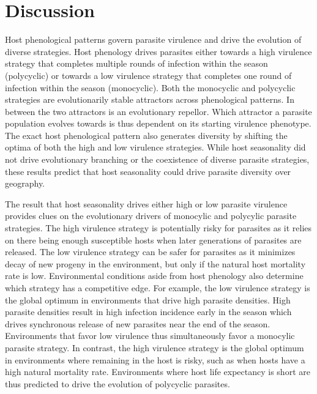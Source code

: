 \documentclass{article}
\begin{document}
\section*{Discussion}
Host phenological patterns govern parasite virulence and drive the evolution of diverse strategies. Host phenology drives parasites either towards a high virulence strategy that completes multiple rounds of infection within the season (polycyclic) or towards a low virulence strategy that completes one round of infection within the season (monocyclic). Both the monocyclic and polycyclic strategies are evolutionarily stable attractors across phenological patterns. In between the two attractors is an evolutionary repellor. Which attractor a parasite population evolves towards is thus dependent on its starting virulence phenotype. The exact host phenological pattern also generates diversity by shifting the optima of both the high and low virulence strategies. While host seasonality did not drive evolutionary branching or the coexistence of diverse parasite strategies, these results predict that host seasonality could drive parasite diversity over geography. 

The result that host seasonality drives either high or low parasite virulence provides clues on the evolutionary drivers of monocylic and polycylic parasite strategies. The high virulence strategy is potentially risky for parasites as it relies on there being enough susceptible hosts when later generations of parasites are released. The low virulence strategy can be safer for parasites as it minimizes decay of new progeny in the environment, but only if the natural host mortality rate is low. Environmental conditions aside from host phenology also determine which strategy has a competitive edge. For example, the low virulence strategy is the  global optimum in environments that drive high parasite densities. High parasite densities result in high infection incidence early in the season which drives synchronous release of new parasites near the end of the season. Environments that favor low virulence thus simultaneously favor a monocylic parasite strategy. In contrast, the high virulence strategy is the global optimum in environments where remaining in the host is risky, such as when hosts have a high natural mortality rate. Environments where host life expectancy is short are thus predicted to drive the evolution of polycyclic parasites. 
\end{document}
